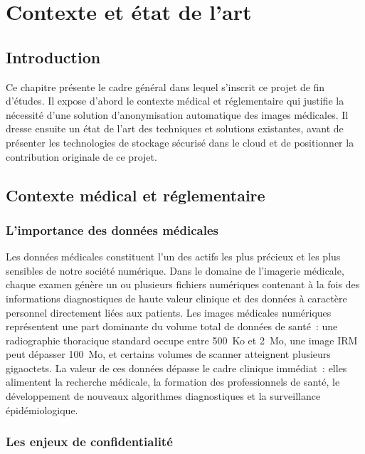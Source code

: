 \chapter{Contexte et état de l'art}

\section*{Introduction}
Ce chapitre présente le cadre général dans lequel s'inscrit ce projet de fin d'études. Il expose d'abord le contexte médical et réglementaire qui justifie la nécessité d'une solution d'anonymisation automatique des images médicales. Il dresse ensuite un état de l'art des techniques et solutions existantes, avant de présenter les technologies de stockage sécurisé dans le cloud et de positionner la contribution originale de ce projet.

\section{Contexte médical et réglementaire}

\subsection{L'importance des données médicales}

Les données médicales constituent l'un des actifs les plus précieux et les plus sensibles de notre société numérique. Dans le domaine de l'imagerie médicale, chaque examen génère un ou plusieurs fichiers numériques contenant à la fois des informations diagnostiques de haute valeur clinique et des données à caractère personnel directement liées aux patients. Les images médicales numériques représentent une part dominante du volume total de données de santé~: une radiographie thoracique standard occupe entre 500~Ko et 2~Mo, une image IRM peut dépasser 100~Mo, et certains volumes de scanner atteignent plusieurs gigaoctets. La valeur de ces données dépasse le cadre clinique immédiat~: elles alimentent la recherche médicale, la formation des professionnels de santé, le développement de nouveaux algorithmes diagnostiques et la surveillance épidémiologique.

\subsection{Les enjeux de confidentialité}

